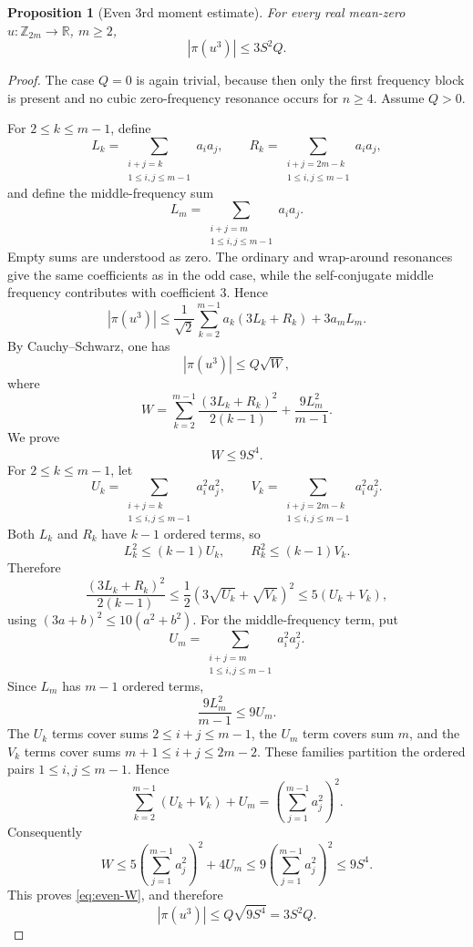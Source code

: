 \documentclass[11pt]{amsart}
\numberwithin{equation}{section}
\theoremstyle{plain}
\newtheorem{proposition}[theorem]{Proposition}
\theoremstyle{remark}
\newcommand{\RR}{\mathbb R}
\newcommand{\Zn}[1]{\mathbb Z_{#1}}
\newcommand{\Ssymbol}{S}
\newcommand{\Qsymbol}{Q}
\newcommand{\Ssq}{\Ssymbol^2}
\newcommand{\Sfour}{\Ssymbol^4}
\newcommand{\AvgSymbol}{\pi}
\newcommand{\Avg}[1]{\AvgSymbol\!\left(#1\right)}
\newcommand{\abs}[1]{\left|#1\right|}
\begin{document}
\begin{proposition}[Even 3rd moment estimate]\label{thm:even-block}
For every real mean-zero \(u:\Zn{2m}\to\RR\), \(m\ge2\),
\[
  \abs{\Avg{u^3}}
  \le 3\Ssq\Qsymbol.
\]
\end{proposition}

\begin{proof}
The case \(\Qsymbol=0\) is again trivial, because then only the first frequency
block is present and no cubic zero-frequency resonance occurs for \(n\ge4\).
Assume \(\Qsymbol>0\).

For \(2\le k\le m-1\), define
\[
  L_k=\sum_{\substack{i+j=k\\1\le i,j\le m-1}}a_i a_j,
  \qquad
  R_k=\sum_{\substack{i+j=2m-k\\1\le i,j\le m-1}}a_i a_j,
\]
and define the middle-frequency sum
\[
  L_m=\sum_{\substack{i+j=m\\1\le i,j\le m-1}}a_i a_j.
\]
Empty sums are understood as zero.  The ordinary and wrap-around resonances give the
same coefficients as in the odd case, while the self-conjugate middle
frequency contributes with coefficient \(3\).  Hence
\begin{equation}\label{eq:even-resonance-bound}
  \abs{\Avg{u^3}}
  \le
  \frac1{\sqrt2}\sum_{k=2}^{m-1}a_k(3L_k+R_k)
  +3a_mL_m.
\end{equation}
By Cauchy--Schwarz, one has
\[
  \abs{\Avg{u^3}}
  \le \Qsymbol\sqrt{W},
\]
where
\[
  W=
  \sum_{k=2}^{m-1}\frac{(3L_k+R_k)^2}{2(k-1)}
  +\frac{9L_m^2}{m-1}.
\]
We prove
\begin{equation}\label{eq:even-W}
  W\le9\Sfour.
\end{equation}
For \(2\le k\le m-1\), let
\[
  U_k=\sum_{\substack{i+j=k\\1\le i,j\le m-1}}a_i^2 a_j^2,
  \qquad
  V_k=\sum_{\substack{i+j=2m-k\\1\le i,j\le m-1}}a_i^2 a_j^2.
\]
Both \(L_k\) and \(R_k\) have \(k-1\) ordered terms, so
\[
  L_k^2\le(k-1)U_k,
  \qquad
  R_k^2\le(k-1)V_k.
\]
Therefore
\[
  \frac{(3L_k+R_k)^2}{2(k-1)}
  \le \frac12\left(3\sqrt{U_k}+\sqrt{V_k}\right)^2
  \le5(U_k+V_k),
\]
using \((3a+b)^2\le10(a^2+b^2)\).  For the middle-frequency term, put
\[
  U_m=\sum_{\substack{i+j=m\\1\le i,j\le m-1}}a_i^2 a_j^2.
\]
Since \(L_m\) has \(m-1\) ordered terms,
\[
  \frac{9L_m^2}{m-1}\le9U_m.
\]
The \(U_k\) terms cover sums \(2\le i+j\le m-1\), the \(U_m\) term covers
sum \(m\), and the \(V_k\) terms cover sums \(m+1\le i+j\le2m-2\).  These
families partition the ordered pairs \(1\le i,j\le m-1\).  Hence
\[
  \sum_{k=2}^{m-1}(U_k+V_k)+U_m
  =\left(\sum_{j=1}^{m-1}a_j^2\right)^2.
\]
Consequently
\[
  W\le
  5\left(\sum_{j=1}^{m-1}a_j^2\right)^2+4U_m
  \le9\left(\sum_{j=1}^{m-1}a_j^2\right)^2
  \le9\Sfour.
\]
This proves \eqref{eq:even-W}, and therefore
\[
  \abs{\Avg{u^3}}
  \le \Qsymbol\sqrt{9\Sfour}=3\Ssq\Qsymbol.
\]
\end{proof}
\end{document}
